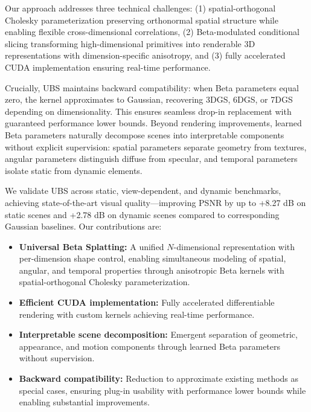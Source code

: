 \documentclass{article} %
\begin{document}
Our approach addresses three technical challenges: (1) spatial-orthogonal Cholesky parameterization preserving orthonormal spatial structure while enabling flexible cross-dimensional correlations, (2) Beta-modulated conditional slicing transforming high-dimensional primitives into renderable 3D representations with dimension-specific anisotropy, and (3) fully accelerated CUDA implementation ensuring real-time performance.

Crucially, UBS maintains backward compatibility: when Beta parameters equal zero, the kernel approximates to Gaussian, recovering 3DGS, 6DGS, or 7DGS depending on dimensionality. This ensures seamless drop-in replacement with guaranteed performance lower bounds. Beyond rendering improvements, learned Beta parameters naturally decompose scenes into interpretable components without explicit supervision: spatial parameters separate geometry from textures, angular parameters distinguish diffuse from specular, and temporal parameters isolate static from dynamic elements.

We validate UBS across static, view-dependent, and dynamic benchmarks, achieving state-of-the-art visual quality—improving PSNR by up to +8.27 dB on static scenes and +2.78 dB on dynamic scenes compared to corresponding Gaussian baselines. Our contributions are:
\begin{itemize}[left=0pt, labelsep=0.5em, noitemsep, topsep=0pt, partopsep=0pt, parsep=0pt]
    \item \textbf{Universal Beta Splatting:} A unified $N$-dimensional representation with per-dimension shape control, enabling simultaneous modeling of spatial, angular, and temporal properties through anisotropic Beta kernels with spatial-orthogonal Cholesky parameterization.
    
    \item \textbf{Efficient CUDA implementation:} Fully accelerated differentiable rendering with custom kernels achieving real-time performance.
    
    \item \textbf{Interpretable scene decomposition:} Emergent separation of geometric, appearance, and motion components through learned Beta parameters without supervision.
    
    \item \textbf{Backward compatibility:} Reduction to approximate existing methods as special cases, ensuring plug-in usability with performance lower bounds while enabling substantial improvements.
\end{itemize}
\end{document}
